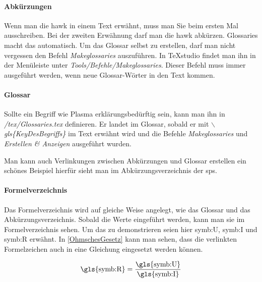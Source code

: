 	\paragraph{Abkürzungen}
	
	Wenn man die \gls{hawk} in einem Text erwähnt, muss man Sie beim ersten Mal ausschreiben. Bei der zweiten Erwähnung darf man die \gls{hawk} abkürzen. Glossaries macht das automatisch. Um das Glossar selbst zu erstellen, darf man nicht vergessen den Befehl \textit{Makeglossaries} auszuführen. In TeXstudio findet man ihn in der Menüleiste unter \textit{Tools/Befehle/Makeglossaries}. Dieser Befehl muss immer ausgeführt werden, wenn neue Glossar-Wörter in den Text kommen. 
	
	\paragraph{Glossar}
	
	Sollte ein Begriff wie \gls{Plasma} erklärungsbedürftig sein, kann man ihn in \textit{/tex/Glossaries.tex} definieren. Er landet im Glossar, sobald er mit \textit{$\backslash$gls\{KeyDesBegriffs\}} im Text erwähnt wird und die Befehle \textit{Makeglossaries} und \textit{Erstellen \& Anzeigen} ausgeführt wurden.
	
	Man kann auch Verlinkungen zwischen Abkürzungen und Glossar erstellen ein schönes Beispiel hierfür sieht man im Abkürzungsverzeichnis der \gls{sps}.
	
	
	\paragraph{Formelverzeichnis}
	
	Das Formelverzeichnis wird auf gleiche Weise angelegt, wie das Glossar und das Abkürzungsverzeichnis. Sobald die Werte eingeführt werden, kann man sie im Formelverzeichnis sehen. Um das zu demonstrieren seien hier \gls{symb:U}, \gls{symb:I} und \gls{symb:R} erwähnt. In \autoref{OhmschesGesetz} kann man sehen, dass die verlinkten Formelzeichen auch in eine Gleichung eingesetzt werden können.
	
	\begin{align}
		\text{\gls{symb:R}}=\frac{\text{\gls{symb:U}}}{\text{\gls{symb:I}}} \label{OhmschesGesetz}
		\end{align}
	
	
	

